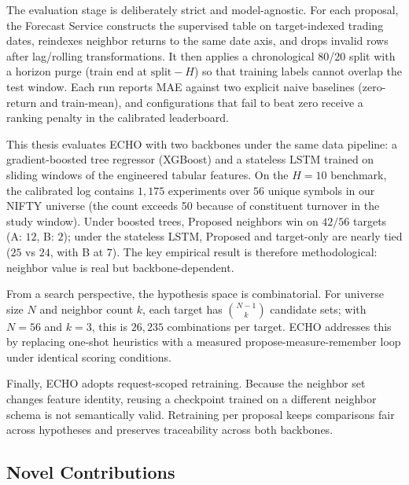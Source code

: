 \documentclass[12pt,a4paper,titlepage]{article}
\begin{document}
The evaluation stage is deliberately strict and model-agnostic. For each proposal, the Forecast Service constructs the supervised table on target-indexed trading dates, reindexes neighbor returns to the same date axis, and drops invalid rows after lag/rolling transformations. It then applies a chronological 80/20 split with a horizon purge (train end at \(\text{split}-H\)) so that training labels cannot overlap the test window. Each run reports MAE against two explicit naive baselines (zero-return and train-mean), and configurations that fail to beat zero receive a ranking penalty in the calibrated leaderboard.

This thesis evaluates ECHO with two backbones under the same data pipeline: a gradient-boosted tree regressor (XGBoost) and a stateless LSTM trained on sliding windows of the engineered tabular features. On the \(H=10\) benchmark, the calibrated log contains \(1{,}175\) experiments over \(56\) unique symbols in our NIFTY universe (the count exceeds 50 because of constituent turnover in the study window). Under boosted trees, Proposed neighbors win on \(42/56\) targets (A: \(12\), B: \(2\)); under the stateless LSTM, Proposed and target-only are nearly tied (\(25\) vs \(24\), with B at \(7\)). The key empirical result is therefore methodological: neighbor value is real but backbone-dependent.

From a search perspective, the hypothesis space is combinatorial. For universe size \(N\) and neighbor count \(k\), each target has \(\binom{N-1}{k}\) candidate sets; with \(N=56\) and \(k=3\), this is \(26{,}235\) combinations per target. ECHO addresses this by replacing one-shot heuristics with a measured propose-measure-remember loop under identical scoring conditions.

Finally, ECHO adopts request-scoped retraining. Because the neighbor set changes feature identity, reusing a checkpoint trained on a different neighbor schema is not semantically valid. Retraining per proposal keeps comparisons fair across hypotheses and preserves traceability across both backbones.

\subsection{Novel Contributions}
\end{document}
